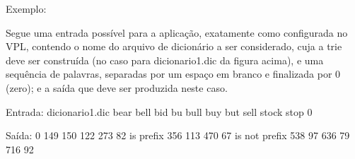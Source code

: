 Exemplo\+:

Segue uma entrada possível para a aplicação, exatamente como configurada no V\+PL, contendo o nome do arquivo de dicionário a ser considerado, cuja a trie deve ser construída (no caso para \textquotesingle{}dicionario1.\+dic\textquotesingle{} da figura acima), e uma sequência de palavras, separadas por um espaço em branco e finalizada por \textquotesingle{}0\textquotesingle{} (zero); e a saída que deve ser produzida neste caso.

Entrada\+: dicionario1.\+dic bear bell bid bu bull buy but sell stock stop 0

Saída\+: 0 149 150 122 273 82 is prefix 356 113 470 67 is not prefix 538 97 636 79 716 92 